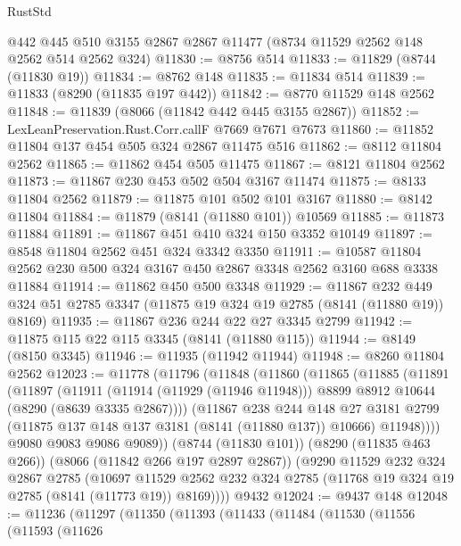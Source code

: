 \begin{lexlean}{RustStd}
\begin{coremodule}
    @442
    @445
    @510
    @3155
    @2867
    @2867
    @11477
    (@8734 @11529 @2562 @148 @2562 @514 @2562 @324)
@11830 := @8756 @514
@11833 := @11829 (@8744 (@11830 @19))
@11834 := @8762 @148
@11835 := @11834 @514
@11839 := @11833 (@8290 (@11835 @197 @442))
@11842 := @8770 @11529 @148 @2562
@11848 := @11839 (@8066 (@11842 @442 @445 @3155 @2867))
@11852 := LexLeanPreservation.Rust.Corr.callF @7669 @7671 @7673
@11860 := @11852 @11804 @137 @454 @505 @324 @2867 @11475 @516
@11862 := @8112 @11804 @2562
@11865 := @11862 @454 @505 @11475
@11867 := @8121 @11804 @2562
@11873 := @11867 @230 @453 @502 @504 @3167 @11474
@11875 := @8133 @11804 @2562
@11879 := @11875 @101 @502 @101 @3167
@11880 := @8142 @11804
@11884 := @11879 (@8141 (@11880 @101)) @10569
@11885 := @11873 @11884
@11891 := @11867 @451 @410 @324 @150 @3352 @10149
@11897 := @8548 @11804 @2562 @451 @324 @3342 @3350
@11911 := @10587 @11804 @2562 @230 @500 @324 @3167 @450 @2867 @3348 @2562 @3160 @688 @3338 @11884
@11914 := @11862 @450 @500 @3348
@11929 := @11867
    @232
    @449
    @324
    @51
    @2785
    @3347
    (@11875 @19 @324 @19 @2785 (@8141 (@11880 @19)) @8169)
@11935 := @11867 @236 @244 @22 @27 @3345 @2799
@11942 := @11875 @115 @22 @115 @3345 (@8141 (@11880 @115))
@11944 := @8149 (@8150 @3345)
@11946 := @11935 (@11942 @11944)
@11948 := @8260 @11804 @2562
@12023 := @11778
    (@11796
      (@11848
        (@11860
          (@11865
            (@11885
              (@11891
                (@11897
                  (@11911
                    (@11914 (@11929 (@11946 @11948)))
                    @8899
                    @8912
                    @10644
                    (@8290 (@8639 @3335 @2867))))
                (@11867
                  @238
                  @244
                  @148
                  @27
                  @3181
                  @2799
                  (@11875 @137 @148 @137 @3181 (@8141 (@11880 @137)) @10666)
                  @11948))))
          @9080
          @9083
          @9086
          @9089))
      (@8744 (@11830 @101))
      (@8290 (@11835 @463 @266))
      (@8066 (@11842 @266 @197 @2897 @2867))
      (@9290
        @11529
        @232
        @324
        @2867
        @2785
        (@10697
          @11529
          @2562
          @232
          @324
          @2785
          (@11768 @19 @324 @19 @2785 (@8141 (@11773 @19)) @8169))))
    @9432
@12024 := @9437 @148
@12048 := @11236
    (@11297
      (@11350
        (@11393
          (@11433
            (@11484
              (@11530
                (@11556
                  (@11593
                    (@11626

\end{coremodule}
\end{lexlean}
